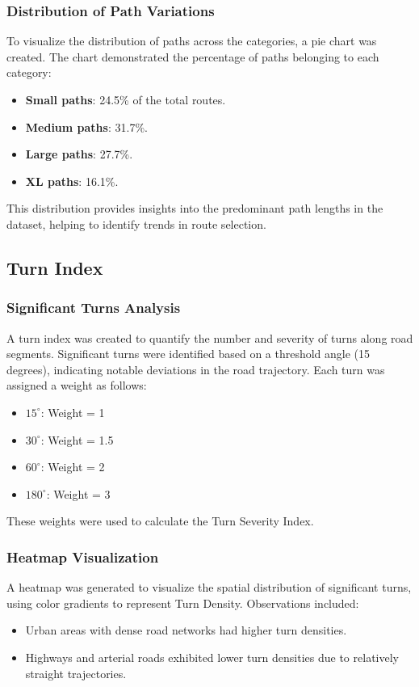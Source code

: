 \documentclass[sigplan,screen]{acmart}
\begin{document}
\subsubsection{Distribution of Path Variations}
To visualize the distribution of paths across the categories, a pie chart was created. The chart demonstrated the percentage of paths belonging to each category:
\begin{itemize}
    \item \textbf{Small paths}: 24.5\% of the total routes.
    \item \textbf{Medium paths}: 31.7\%.
    \item \textbf{Large paths}: 27.7\%.
    \item \textbf{XL paths}: 16.1\%.
\end{itemize}
This distribution provides insights into the predominant path lengths in the dataset, helping to identify trends in route selection.

\subsection{Turn Index}
\subsubsection{Significant Turns Analysis}
A turn index was created to quantify the number and severity of turns along road segments. Significant turns were identified based on a threshold angle (15 degrees), indicating notable deviations in the road trajectory. Each turn was assigned a weight as follows:
\begin{itemize}
    \item $15^\circ$: Weight = 1
    \item  $30^\circ$: Weight = 1.5
    \item  $60^\circ$: Weight = 2
    \item  $180^\circ$: Weight = 3
\end{itemize}
These weights were used to calculate the Turn Severity Index.

\subsubsection{Heatmap Visualization}
A heatmap was generated to visualize the spatial distribution of significant turns, using color gradients to represent Turn Density. Observations included:
\begin{itemize}
    \item Urban areas with dense road networks had higher turn densities.
    \item Highways and arterial roads exhibited lower turn densities due to relatively straight trajectories.
\end{itemize}
\end{document}
